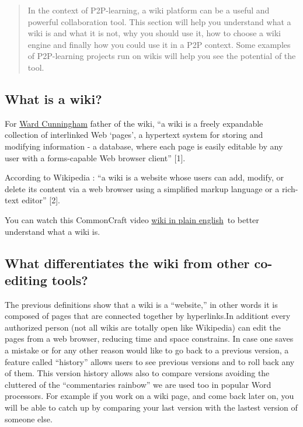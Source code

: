 
\begin{quote}
In the context of P2P-learning, a wiki platform can be a useful and
powerful collaboration tool. This section will help you understand
what a wiki is and what it is not, why you should use it, how to
choose a wiki engine and finally how you could use it in a P2P
context. Some examples of P2P-learning projects run on wikis will help
you see the potential of the tool.
\end{quote}

\subsection{What is a wiki?}

For \href{http://en.wikipedia.org/wiki/Ward_cunningham}{Ward Cunningham}
father of the wiki, ``a wiki is a freely expandable collection of
interlinked Web `pages', a hypertext system for storing and modifying
information - a database, where each page is easily editable by any user
with a forms-capable Web browser client'' {[}1{]}.

According to Wikipedia : ``a wiki is a website whose users can add,
modify, or delete its content via a web browser using a simplified
markup language or a rich-text editor'' {[}2{]}.

You can watch this CommonCraft video
\href{http://www.youtube.com/watch?v=-dnL00TdmLY}{wiki in plain
english}~to better understand what a wiki is.

\subsection{What differentiates the wiki from other co-editing tools?}

The previous definitions show that a wiki is a ``website,'' in other
words it is composed of pages that are connected together by
hyperlinks.In additiont every authorized person (not all wikis are
totally open like Wikipedia) can edit the pages from a web browser,
reducing time and space constrains. In case one saves a mistake or for
any other reason would like to go back to a previous version, a feature
called ``history'' allows users to see previous versions and to roll
back any of them. This version history allows also to compare versions
avoiding the cluttered of the ``commentaries rainbow'' we are used too
in popular Word processors. For example if you work on a wiki page, and
come back later on, you will be able to catch up by comparing your last
version with the lastest version of someone else.

